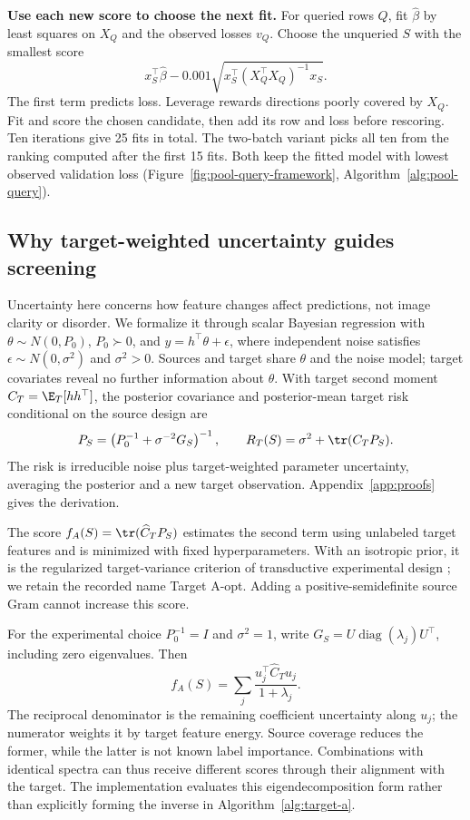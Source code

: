 \noindent\textbf{Use each new score to choose the next fit.}
For queried rows $Q$, fit $\widehat\beta$ by least squares on $X_Q$ and the observed losses $v_Q$. Choose the unqueried $S$ with the smallest score
\begin{equation}
 x_S^\top\widehat\beta-0.001\sqrt{x_S^\top(X_Q^\top X_Q)^{-1}x_S}.
 \label{eq:pool-acquisition}
\end{equation}
The first term predicts loss. Leverage rewards directions poorly covered by $X_Q$. Fit and score the chosen candidate, then add its row and loss before rescoring. Ten iterations give 25 fits in total. The two-batch variant picks all ten from the ranking computed after the first 15 fits. Both keep the fitted model with lowest observed validation loss (Figure~\ref{fig:pool-query-framework}, Algorithm~\ref{alg:pool-query}).

\subsection{Why target-weighted uncertainty guides screening}
Uncertainty here concerns how feature changes affect predictions, not image clarity or disorder. We formalize it through scalar Bayesian regression with $\theta\sim N(0,P_0)$, $P_0\succ0$, and $y=h^\top\theta+\epsilon$, where independent noise satisfies $\epsilon\sim N(0,\sigma^2)$ and $\sigma^2>0$. Sources and target share $\theta$ and the noise model; target covariates reveal no further information about $\theta$. With target second moment $C_T=\E_T[hh^\top]$, the posterior covariance and posterior-mean target risk conditional on the source design are
\begin{equation}
 P_S=\left(P_0^{-1}+\sigma^{-2}G_S\right)^{-1},\qquad
 R_T(S)=\sigma^2+\tr(C_TP_S).
 \label{eq:risk}
\end{equation}
The risk is irreducible noise plus target-weighted parameter uncertainty, averaging the posterior and a new target observation. Appendix~\ref{app:proofs} gives the derivation.

The score $f_A(S)=\tr(\widehat C_TP_S)$ estimates the second term using unlabeled target features and is minimized with fixed hyperparameters. With an isotropic prior, it is the regularized target-variance criterion of transductive experimental design \citep{yu2006,hubotter2024transductive}; we retain the recorded name Target A-opt. Adding a positive-semidefinite source Gram cannot increase this score.

For the experimental choice $P_0^{-1}=I$ and $\sigma^2=1$, write $G_S=U\operatorname{diag}(\lambda_j)U^\top$, including zero eigenvalues. Then
\begin{equation}
 f_A(S)=\sum_j\frac{u_j^\top\widehat C_Tu_j}{1+\lambda_j}.
 \label{eq:target-directions}
\end{equation}
The reciprocal denominator is the remaining coefficient uncertainty along $u_j$; the numerator weights it by target feature energy. Source coverage reduces the former, while the latter is not known label importance. Combinations with identical spectra can thus receive different scores through their alignment with the target. The implementation evaluates this eigendecomposition form rather than explicitly forming the inverse in Algorithm~\ref{alg:target-a}.

